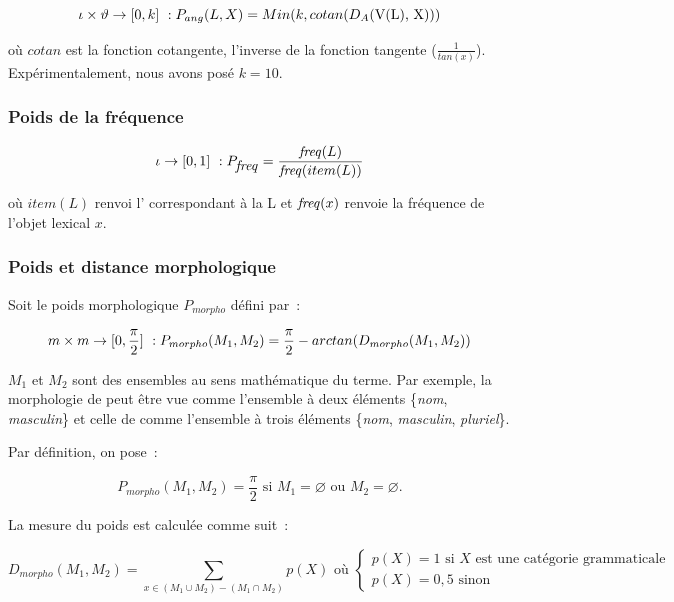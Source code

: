 \begin{equation}
\iota \times \vartheta \rightarrow [0, k]~: P_{ang}(L,X) =
Min(k,cotan(\mbox{$D_{A}($V(L), X$)$}))
\end{equation}

où $cotan$ est la fonction cotangente, l'inverse de la fonction
tangente ($\frac{1}{tan(x)}$). Expérimentalement, nous avons posé
$k=10$.

\subsubsection{Poids de la fréquence}

\begin{equation}
\iota \rightarrow [0,1]~: P_{\mbox{\emph{freq}}} = \frac{\mbox{\emph{freq}}(L)}{\mbox{\emph{freq}}(item(L))}
\end{equation}

où $item(L)$ renvoi l' correspondant à la
 L et $\mbox{\emph{freq}}(x)$ renvoie la fréquence de l'objet lexical
$x$.

  \subsubsection{Poids et distance morphologique}\label{sec:poids-et-distance-morpho}
  
  Soit le poids morphologique $P_{morpho}$ défini par~:

  \begin{equation}
  m\times m \rightarrow [0, \frac{\pi}{2}]~: P_{morpho}
  (M_1, M_2) = \frac{\pi}{2} - arctan(D_{morpho}(M_1,M_2))
  \end{equation}
  
  $M_1$ et $M_2$ sont des ensembles au sens mathématique du terme. Par
  exemple, la morphologie de  peut être vue comme
  l'ensemble à deux éléments \{\emph{nom}, \emph{masculin}\} et celle
  de  comme l'ensemble à trois éléments \{\emph{nom},
  \emph{masculin}, \emph{pluriel}\}.
  
  Par définition, on pose~:

\begin{equation}
P_{morpho}(M_1,M_2) =
\frac{\pi}{2} \mbox{ si } M_1 = \varnothing \mbox{ ou }M_2 =
\varnothing.\label{eq:4}
\end{equation}
  
La mesure du poids est calculée comme suit~:

\begin{equation}
  D_{morpho}(M_1,M_2) = \sum_{x\in (M_1 \cup M_2) - (M_1\cap M_2)} p(X) \mbox{ où } \left\{
  \begin{array}{l}
    p(X) = 1 \mbox{ si } X \mbox{ est une catégorie grammaticale}\\
    p(X) = 0,5 \mbox{ sinon}
  \end{array}
  \right.
\end{equation}

